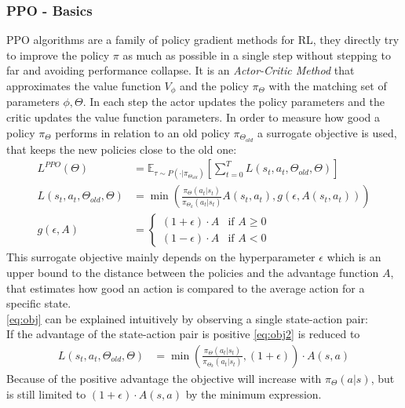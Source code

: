 \subsubsection{PPO - Basics} \label{sec:ppo}
PPO algorithms \cite{schulman2017proximal} are a family of policy gradient methods for RL, they directly try to improve the policy $\pi$ as much as possible in a single step without stepping to far and avoiding performance collapse. It is an \emph{Actor-Critic Method} that approximates the value function $V_{\phi}$ and the policy $\pi_{\Theta}$ with the matching set of parameters $\phi, \Theta$. In each step the actor updates the policy parameters and the critic updates the value function parameters. In order to measure how good a policy $\pi_{\Theta}$ performs in relation to an old policy $\pi_{\Theta_{old}}$ a surrogate objective is used, that keeps the new policies close to the old one:
\begin{align}
	L^{PPO} (\Theta) &= \mathbb{E}_{\tau \sim P(\cdot | \pi_{\Theta_{old}})}[\sum_{t=0}^{T} L(s_t, a_t, \Theta_{old}, \Theta)] \label{eq:obj} \\
	L(s_t, a_t, \Theta_{old}, \Theta) &= \min (
	\frac{\pi_{\Theta}(a_t|s_t)}{\pi_{\Theta_k}(a_t|s_t)} A(s_t, a_t), g(\epsilon, A(s_t, a_t))) \label{eq:obj2}\\
	g(\epsilon, A) &= 
	\left\{
	\begin{array}{ll}
		(1 + \epsilon) \cdot  A  & \mbox{if } A \geq 0\\
		(1 - \epsilon) \cdot A & \mbox{if } A < 0
	\end{array}
	\right. \label{eq:g}
\end{align}
\newline
This surrogate objective mainly depends on the hyperparameter $\epsilon$ which is an upper bound to the distance between the policies and the advantage function $A$, that estimates how good an action is compared to the average action for a specific state.\\
\cref{eq:obj} can be explained intuitively by observing a single state-action pair:\\
If the advantage of the state-action pair is positive \cref{eq:obj2} is reduced to
\begin{align}
	L(s_t, a_t, \Theta_{old}, \Theta) &= \min (\frac{\pi_{\Theta}(a_t|s_t)}{\pi_{\Theta_k}(a_t|s_t)}, (1 + \epsilon)) \cdot A(s,a)
\end{align}
Because of the positive advantage the objective will increase with $\pi_{\Theta} (a|s)$, but is still limited to $(1 + \epsilon) \cdot A(s,a)$ by the minimum expression. \\
